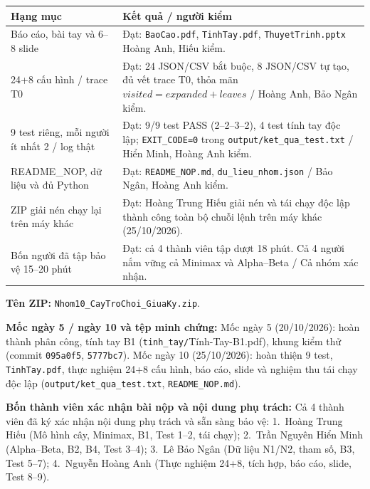 \documentclass[11pt,a4paper]{article}
\newcommand{\head}[1]{\par\Needspace{3\baselineskip}\medskip{\large\sffamily\bfseries\color{Ink}#1}\par}
\newcommand{\code}[1]{\nolinkurl{#1}}
\begin{document}
\head{10. Kiểm tra trước khi nộp}
\begingroup\footnotesize\renewcommand{\arraystretch}{1.08}\begin{tabularx}{\linewidth}{XX}\toprule
\textbf{Hạng mục} & \textbf{Kết quả / người kiểm}\\\midrule
Báo cáo, bài tay và 6–8 slide & Đạt: \code{BaoCao.pdf}, \code{TinhTay.pdf}, \code{ThuyetTrinh.pptx} Hoàng Anh, Hiếu kiểm.\\
24+8 cấu hình / trace T0 & Đạt: 24 JSON/CSV bắt buộc, 8 JSON/CSV tự tạo, đủ vết trace T0, thỏa mãn $\mathit{visited} = \mathit{expanded} + \mathit{leaves}$ / Hoàng Anh, Bảo Ngân kiểm.\\
9 test riêng, mỗi người ít nhất 2 / log thật & Đạt: 9/9 test PASS (2--2--3--2), 4 test tính tay độc lập; \code{EXIT_CODE=0} trong \code{output/ket_qua_test.txt} / Hiển Minh, Hoàng Anh kiểm.\\
README\_NOP, dữ liệu và đủ Python & Đạt: \code{README_NOP.md}, \code{du_lieu_nhom.json} / Bảo Ngân, Hoàng Anh kiểm.\\
ZIP giải nén chạy lại trên máy khác & Đạt: Hoàng Trung Hiếu giải nén và tái chạy độc lập thành công toàn bộ chuỗi lệnh trên máy khác (25/10/2026).\\
Bốn người đã tập bảo vệ 15–20 phút & Đạt: cả 4 thành viên tập dượt 18 phút. Cả 4 người nắm vững cả Minimax và Alpha--Beta / Cả nhóm xác nhận.\\
\bottomrule\end{tabularx}\endgroup\par\smallskip
\textbf{Tên ZIP:} \code{Nhom10_CayTroChoi_GiuaKy.zip}.\par
\textbf{Mốc ngày 5 / ngày 10 và tệp minh chứng:} Mốc ngày 5 (20/10/2026): hoàn thành phân công, tính tay B1 (\code{tinh_tay/}Tính-Tay-B1.pdf), khung kiểm thử (commit \code{095a0f5}, \code{5777bc7}). Mốc ngày 10 (25/10/2026): hoàn thiện 9 test, \code{TinhTay.pdf}, thực nghiệm 24+8 cấu hình, báo cáo, slide và nghiệm thu tái chạy độc lập (\code{output/ket_qua_test.txt}, \code{README_NOP.md}).\par
\textbf{Bốn thành viên xác nhận bài nộp và nội dung phụ trách:} Cả 4 thành viên đã ký xác nhận nội dung phụ trách và sẵn sàng bảo vệ: 1.~Hoàng Trung Hiếu (Mô hình cây, Minimax, B1, Test 1--2, tái chạy); 2.~Trần Nguyên Hiển Minh (Alpha--Beta, B2, B4, Test 3--4); 3.~Lê Bảo Ngân (Dữ liệu N1/N2, tham số, B3, Test 5--7); 4.~Nguyễn Hoàng Anh (Thực nghiệm 24+8, tích hợp, báo cáo, slide, Test 8--9).\par
\end{document}
